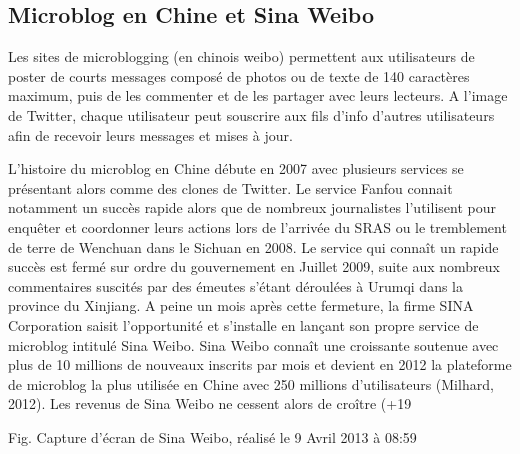 \subsection[Microblog en Chine et Sina Weibo]{Microblog en Chine et Sina Weibo}
Les sites de microblogging (en chinois weibo) permettent aux utilisateurs de poster de courts messages composé de photos ou de texte de 140 caractères maximum, puis de les commenter et de les partager avec leurs lecteurs. A l’image de Twitter, chaque utilisateur peut souscrire aux fils d’info d’autres utilisateurs afin de recevoir leurs messages et mises à jour.

L’histoire du microblog en Chine débute en 2007 avec plusieurs services se présentant alors comme des clones de Twitter. Le service Fanfou connait notamment un succès rapide alors que de nombreux journalistes l’utilisent pour enquêter et coordonner leurs actions lors de l’arrivée du SRAS ou le tremblement de terre de Wenchuan dans le Sichuan en 2008. Le service qui connaît un rapide succès est fermé sur ordre du gouvernement en Juillet 2009, suite aux nombreux commentaires suscités par des émeutes s’étant déroulées à Urumqi dans la province du Xinjiang. A peine un mois après cette fermeture, la firme SINA Corporation saisit l’opportunité et s’installe en lançant son propre service de microblog intitulé Sina Weibo. Sina Weibo connaît une croissante soutenue avec plus de 10 millions de nouveaux inscrits par mois et devient en 2012 la plateforme de microblog la plus utilisée en Chine avec 250 millions d’utilisateurs (Milhard, 2012). Les revenus de Sina Weibo ne cessent alors de croître (+19%


Fig. Capture d’écran de Sina Weibo, réalisé le 9 Avril 2013 à 08:59

